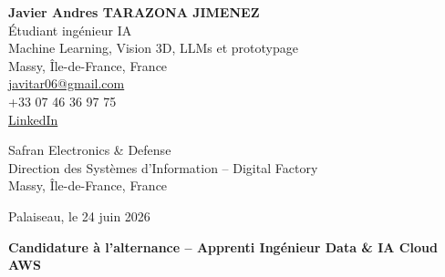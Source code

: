 \documentclass[10pt,a4paper]{article}
\begin{document}
\begin{minipage}[t]{0.48\textwidth}
\textbf{\large Javier Andres TARAZONA JIMENEZ}\\
Étudiant ingénieur IA \\
Machine Learning, Vision 3D, LLMs et prototypage \\
Massy, Île-de-France, France\\
\href{mailto:javitar06@gmail.com}{javitar06@gmail.com}\\
+33 07 46 36 97 75\\
\href{https://www.linkedin.com/in/javier-andres-tarazona-jimenez-84b489222/}{LinkedIn}
\end{minipage}
\hfill
\begin{minipage}[t]{0.42\textwidth}
\raggedleft
Safran Electronics \& Defense \\
Direction des Systèmes d’Information – Digital Factory \\
Massy, Île-de-France, France \\
\end{minipage}

\vspace{1.1cm}

\raggedleft
Palaiseau, le 24 juin 2026

\vspace{0.7cm}

\raggedright
\textbf{Candidature à l’alternance – Apprenti Ingénieur Data \& IA Cloud AWS}

\vspace{0.5cm}
\end{document}
